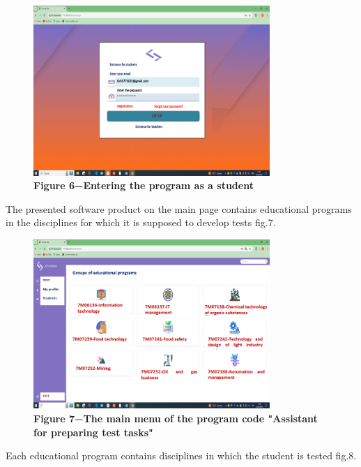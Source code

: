 \begin{figure}[H]
	\centering
	\includegraphics[width=0.8\textwidth]{assets/131}
	\caption*{\bfseries Figure 6−Entering the program as a student}
\end{figure}
\begin{multicols}{2}

The presented software product on the main page contains educational
programs in the disciplines for which it is supposed to develop tests
fig.7.
\end{multicols}

\begin{figure}[H]
	\centering
	\includegraphics[width=0.8\textwidth]{assets/132}
	\caption*{\bfseries Figure 7−The main menu of the program code "Assistant for
	preparing test tasks"}
\end{figure}

\begin{multicols}{2}

Each educational program contains disciplines in which the student is
tested fig.8.
\end{multicols}


